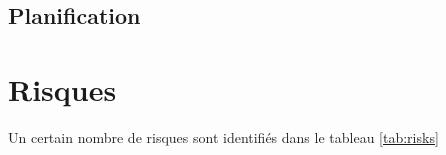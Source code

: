 \documentclass[a4paper, oneside, 12pt, titlepage, draft]{article}
\begin{document}
\subsection{Planification}


\section{Risques}

%
%

Un certain nombre de risques sont identifiés dans le tableau \ref{tab:risks}
\end{document}
